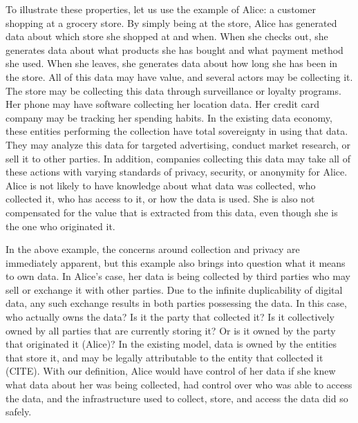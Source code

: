 To illustrate these properties, let us use the example of Alice: a customer shopping at a grocery store. By simply being at the store, Alice has generated data about which store she shopped at and when. When she checks out, she generates data about what products she has bought and what payment method she used. When she leaves, she generates data about how long she has been in the store. All of this data may have value, and several actors may be collecting it. The store may be collecting this data through surveillance or loyalty programs. Her phone may have software collecting her location data. Her credit card company may be tracking her spending habits. In the existing data economy, these entities performing the collection have total sovereignty in using that data. They may analyze this data for targeted advertising, conduct market research, or sell it to other parties. In addition, companies collecting this data may take all of these actions with varying standards of privacy, security, or anonymity for Alice. Alice is not likely to have knowledge about what data was collected, who collected it, who has access to it, or how the data is used. She is also not compensated for the value that is extracted from this data, even though she is the one who originated it.

In the above example, the concerns around collection and privacy are immediately apparent, but this example also brings into question what it means to own data. In Alice's case, her data is being collected by third parties who may sell or exchange it with other parties. Due to the infinite duplicability of digital data, any such exchange results in both parties possessing the data. In this case, who actually owns the data? Is it the party that collected it? Is it collectively owned by all parties that are currently storing it? Or is it owned by the party that originated it (Alice)? In the existing model, data is owned by the entities that store it, and may be legally attributable to the entity that collected it (CITE). With our definition, Alice would have control of her data if she knew what data about her was being collected, had control over who was able to access the data, and the infrastructure used to collect, store, and access the data did so safely.

%

